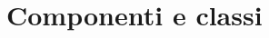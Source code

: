 \documentclass[../SpecificaTecnica.tex]{subfiles}
\begin{document}
\section{Componenti e classi}
\end{document}
